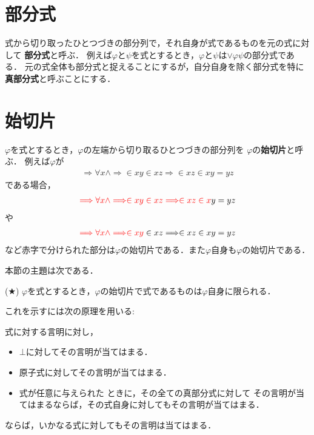 \section{部分式}
	式から切り取ったひとつづきの部分列で，それ自身が式であるものを元の式に対して
	{\bf 部分式}と呼ぶ．
	例えば$\varphi$と$\psi$を式とするとき，$\varphi$と$\psi$は$\vee \varphi \psi$の部分式である．
	元の式全体も部分式と捉えることにするが，自分自身を除く部分式を特に
	{\bf 真部分式}と呼ぶことにする．
	
\section{始切片}
	$\varphi$を式とするとき，$\varphi$の左端から切り取るひとつづきの部分列を
	$\varphi$の{\bf 始切片}と呼ぶ．
	例えば$\varphi$が
	\begin{align}
		\Longrightarrow \forall x \wedge \Longrightarrow \in xy \in xz \Longrightarrow \in xz \in xy = yz
	\end{align}
	である場合，
	\begin{align}
		\textcolor{red}{\Longrightarrow \forall x \wedge \Longrightarrow \in xy \in xz \Longrightarrow \in xz \in x}y = yz
	\end{align}
	や
	\begin{align}
		\textcolor{red}{\Longrightarrow \forall x \wedge \Longrightarrow \in xy} \in xz \Longrightarrow \in xz \in xy = yz
	\end{align}
	など赤字で分けられた部分は$\varphi$の始切片である．また$\varphi$自身も$\varphi$の始切片である．
	
	本節の主題は次である．
	\begin{screen}
		\begin{metathm}
			(★) $\varphi$を式とするとき，$\varphi$の始切片で式であるものは$\varphi$自身に限られる．
		\end{metathm}
	\end{screen}
	
	これを示すには次の原理を用いる:
	\begin{screen}
		\begin{metaaxm}[式に対する構造的帰納法]
			式に対する言明に対し，
			\begin{itemize}
				\item $\bot$に対してその言明が当てはまる．
				\item 原子式に対してその言明が当てはまる．
				\item 式が任意に与えられた\footnotemark
					ときに，その全ての真部分式に対して
					その言明が当てはまるならば，その式自身に対してもその言明が当てはまる．
			\end{itemize}
			ならば，いかなる式に対してもその言明は当てはまる．
		\end{metaaxm}
	\end{screen}
	
